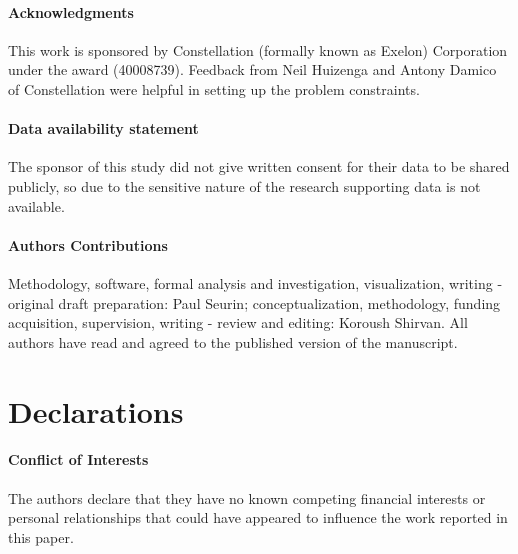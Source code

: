 \documentclass[a4paper]{article}
\begin{document}
\paragraph{Acknowledgments}
This work is sponsored by Constellation (formally known as Exelon) Corporation under the award (40008739). Feedback from Neil Huizenga  and Antony Damico of Constellation were helpful in setting up the problem constraints. 

\paragraph{Data availability statement}
The sponsor of this study did not give written consent for their data to be shared publicly, so due to the sensitive nature of the research supporting data is not available.

\paragraph{Authors Contributions}
 Methodology, software, formal analysis and investigation, visualization, writing - original draft preparation: Paul Seurin; conceptualization, methodology, funding acquisition, supervision, writing - review and editing: Koroush Shirvan. All authors have read and agreed to the published
version of the manuscript.

\section*{Declarations}
\paragraph{Conflict of Interests}
The authors declare that they have no known competing financial interests or personal relationships that could have appeared to influence the work reported in this paper.
\small
 \setlength{\baselineskip}{12pt}
 

\pagebreak
\normalsize
\appendix

\end{document}

